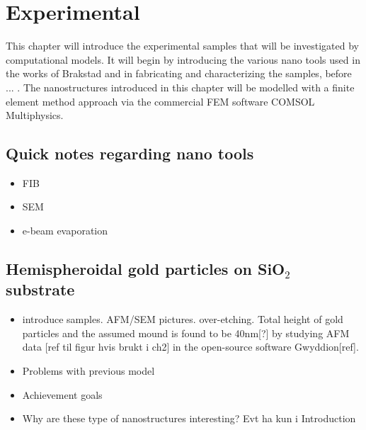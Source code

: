 
\chapter{Experimental} \label{chapter3}
This chapter will introduce the experimental samples that will be investigated by computational models. It will begin by introducing the various nano tools used in the works of Brakstad \cite{brakstad_thesis} and \cite{gasbcones} in fabricating and characterizing the samples, before ... . The nanostructures introduced in this chapter will be modelled with a finite element method approach via the commercial FEM software COMSOL Multiphysics.
\section{Quick notes regarding nano tools}
\begin{itemize}
    \item FIB
    \item SEM
    \item e-beam evaporation
\end{itemize}


\section{Hemispheroidal gold particles on SiO$_2$ substrate}
\begin{itemize}
    \item introduce samples. AFM/SEM pictures. over-etching. Total height of gold particles and the assumed mound is found to be 40nm[?] by studying AFM data [ref til figur hvis brukt i ch2] in the open-source software Gwyddion[ref].
    \item Problems with previous model
    \item Achievement goals   
    \item Why are these type of nanostructures interesting? Evt ha kun i Introduction
\end{itemize}

